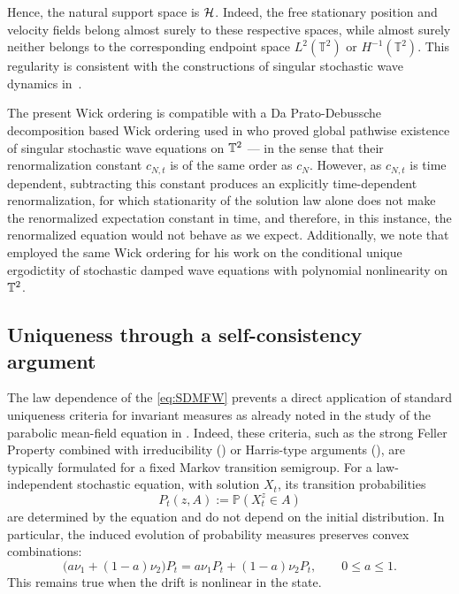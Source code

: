 \noindent
Hence, the natural support space is $\mathcal{H}$.
Indeed, the free stationary position and velocity fields belong almost surely to these respective spaces, while almost surely
neither belongs to the corresponding endpoint space $L^2(\mathbb{T}^2)$ or $H^{-1}(\mathbb{T}^2)$. This regularity is consistent with the constructions of singular stochastic wave dynamics in~\cite{GKOT2022,liu2025}.

\begin{remark}
    The present Wick ordering is compatible with a Da Prato-Debussche decomposition based Wick ordering used in \cite{GKOT2022,liu2025} who proved global pathwise existence of singular stochastic wave equations on $\mathbb{T}^2$ --- in the sense that their renormalization constant $c_{N,t}$ is of the same order as $c_N$.
    However, as $c_{N,t}$ is time dependent, subtracting this constant produces an explicitly time-dependent renormalization, for which stationarity of the solution law alone does not make the renormalized expectation constant in time, and therefore, in this instance, the renormalized equation would not behave as we expect. 
    Additionally, we note that \cite{Tolomeo2023Ergodicity} employed the same Wick ordering for his work on the conditional unique ergodictity of stochastic damped wave equations with polynomial nonlinearity on $\mathbb{T}^2$. 
\end{remark}

\subsection{Uniqueness through a self-consistency argument}
The law dependence of the \eqref{eq:SDMFW} prevents a direct application of standard uniqueness criteria for invariant measures as already noted in the study of the parabolic mean-field equation in \cite{Shen2022}.
Indeed, these criteria, such as the strong Feller Property combined with irreducibility (\cite{Da_Prato_Zabczyk_1996, HairerMattingly2018}) or Harris-type arguments (\cite{Hairer2011}), are typically formulated for a fixed Markov transition semigroup.
For a law-independent stochastic equation, with solution $X_t$, its transition probabilities
\[
    P_t(z,A):=\mathbb{P}(X_t^z\in A)
\]
are determined by the equation and do not depend on the initial distribution. In particular, the induced evolution of probability measures preserves convex combinations:
\[
    \bigl(a\nu_1+(1-a)\nu_2\bigr)P_t
    =
    a\nu_1P_t+(1-a)\nu_2P_t,
    \qquad 0\leq a\leq1.
\]
This remains true when the drift is nonlinear in the state.

